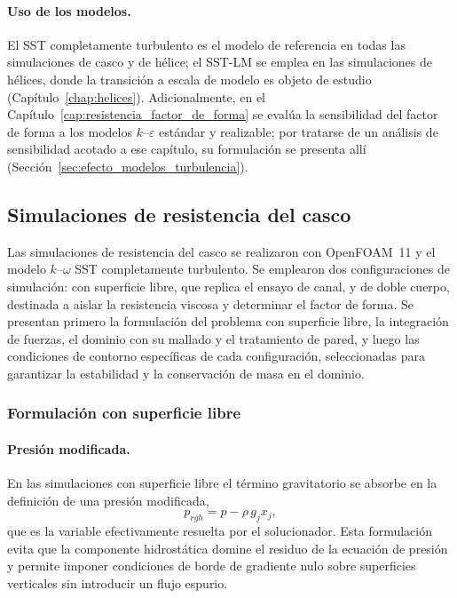 \paragraph{Uso de los modelos.}
El SST completamente turbulento es el modelo de referencia en todas las simulaciones de casco y de hélice; el SST-LM se emplea en las simulaciones de hélices, donde la transición a escala de modelo es objeto de estudio (Capítulo~\ref{chap:helices}). Adicionalmente, en el Capítulo~\ref{cap:resistencia_factor_de_forma} se evalúa la sensibilidad del factor de forma a los modelos $k$--$\varepsilon$ estándar y realizable; por tratarse de un análisis de sensibilidad acotado a ese capítulo, su formulación se presenta allí (Sección~\ref{sec:efecto_modelos_turbulencia}).

\subsection{Simulaciones de resistencia del casco}
\label{sec:cfd_casco}

Las simulaciones de resistencia del casco se realizaron con OpenFOAM~11 y el modelo $k$--$\omega$ SST completamente turbulento. Se emplearon dos configuraciones de simulación: con superficie libre, que replica el ensayo de canal, y de doble cuerpo, destinada a aislar la resistencia viscosa y determinar el factor de forma. Se presentan primero la formulación del problema con superficie libre, la integración de fuerzas, el dominio con su mallado y el tratamiento de pared, y luego las condiciones de contorno específicas de cada configuración, seleccionadas para garantizar la estabilidad y la conservación de masa en el dominio.

\subsubsection{Formulación con superficie libre}
\paragraph{Presión modificada.}
En las simulaciones con superficie libre el término gravitatorio se absorbe
en la definición de una presión modificada,
%
\begin{equation}\label{eq:prgh}
    p_{rgh} = p - \rho\, g_j x_j ,
\end{equation}
%
que es la variable efectivamente resuelta por el solucionador. Esta
formulación evita que la componente hidrostática domine el residuo de la
ecuación de presión y permite imponer condiciones de borde de gradiente nulo
sobre superficies verticales sin introducir un flujo espurio.
 

